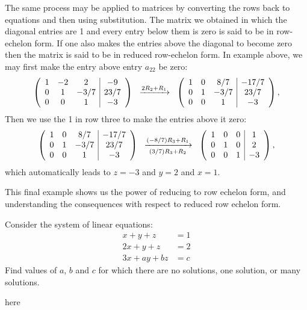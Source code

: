 \documentclass{ximera}
\begin{document}
\begin{example}
\begin{solution}
The same process may be applied to matrices by converting the rows back to equations and then using substitution. The matrix we obtained in which the diagonal entries are 1 and every entry below them is zero is said to be in row-echelon form. If one also makes the entries above the diagonal to become zero then the matrix is said to be in reduced row-echelon form. In example above, we may first make the entry above entry $a_{22}$ be zero:
\[
\left(\begin{array}{ccc|c}
  1 &  -2 & 2 &-9 \\
  0 & 1 & -3/7 & 23/7 \\
  0 &  0 & 1 & -3
\end{array}\right)
\hspace{.2cm}\xrightarrow{2R_{2}+R_{1}} \hspace{.2cm}
\left(\begin{array}{ccc|c}
  1 &  0 & 8/7 &-17/7 \\
  0 & 1 & -3/7 & 23/7 \\
  0 &  0 & 1 & -3
\end{array}\right),
\]
Then we use the 1 in row three to make the entries above it zero:
\[
\left(\begin{array}{ccc|c}
  1 &  0 & 8/7 &-17/7 \\
  0 & 1 & -3/7 & 23/7 \\
  0 &  0 & 1 & -3
\end{array}\right)
\hspace{.2cm}\xrightarrow[(3/7)R_{3}+R_{2}]{(-8/7)R_{3}+R_{1}} \hspace{.2cm}
\left(\begin{array}{ccc|c}
  1 &  0 & 0 &1 \\
  0 & 1 & 0& 2 \\
  0 &  0 & 1 & -3
\end{array}\right),
\]
which automatically leads to $z=-3$ and $y=2$ and $x=1$.
\end{solution}
\end{example}




This final example shows us the power of reducing to row echelon form, and understanding the consequences with respect to reduced row echelon form.

\begin{example}
  Consider the system of linear equations:
  \begin{align*}
    x+y+z &=  1\\
    2x+y+z &=  2\\
    3x+ay+bz &= c
  \end{align*}
  Find values of $a$, $b$ and $c$ for which there are no solutions,
  one solution, or many solutions.
  \begin{solution}
    here
  \end{solution}
\end{example}
\end{document}
